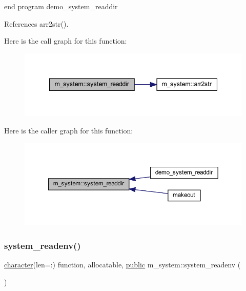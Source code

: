 end program demo\+\_\+system\+\_\+readdir 

References arr2str().

Here is the call graph for this function\+:
\nopagebreak
\begin{figure}[H]
\begin{center}
\leavevmode
\includegraphics[width=347pt]{namespacem__system_a983df5b2d7cb5842d69c4a31829403e0_cgraph}
\end{center}
\end{figure}
Here is the caller graph for this function\+:
\nopagebreak
\begin{figure}[H]
\begin{center}
\leavevmode
\includegraphics[width=350pt]{namespacem__system_a983df5b2d7cb5842d69c4a31829403e0_icgraph}
\end{center}
\end{figure}
\mbox{\label{namespacem__system_ae0e43010a82a6a25402568ccb326322d}} 
\subsubsection{\texorpdfstring{system\+\_\+readenv()}{system\_readenv()}}
{\footnotesize\ttfamily \hyperlink{option__stopwatch_83_8txt_abd4b21fbbd175834027b5224bfe97e66}{character}(len=\+:) function, allocatable, \hyperlink{M__stopwatch_83_8txt_a2f74811300c361e53b430611a7d1769f}{public} m\+\_\+system\+::system\+\_\+readenv (\begin{DoxyParamCaption}{ }\end{DoxyParamCaption})}



